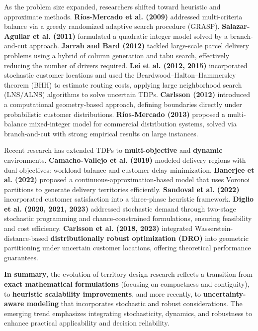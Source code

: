 \documentclass[preprint,12pt,authoryear]{elsarticle}
\begin{document}
As the problem size expanded, researchers shifted toward heuristic and approximate methods. \textbf{Ríos-Mercado et al. (2009)} addressed multi-criteria balance via a greedy randomized adaptive search procedure (GRASP). \textbf{Salazar-Aguilar et al. (2011)} formulated a quadratic integer model solved by a branch-and-cut approach. \textbf{Jarrah and Bard (2012)} tackled large-scale parcel delivery problems using a hybrid of column generation and tabu search, effectively reducing the number of drivers required. \textbf{Lei et al. (2012, 2015)} incorporated stochastic customer locations and used the Beardwood–Halton–Hammersley theorem (BHH) to estimate routing costs, applying large neighborhood search (LNS/ALNS) algorithms to solve uncertain TDPs. \textbf{Carlsson (2012)} introduced a computational geometry-based approach, defining boundaries directly under probabilistic customer distributions. \textbf{Ríos-Mercado (2013)} proposed a multi-balance mixed-integer model for commercial distribution systems, solved via branch-and-cut with strong empirical results on large instances.

Recent research has extended TDPs to \textbf{multi-objective} and \textbf{dynamic} environments. \textbf{Camacho-Vallejo et al. (2019)} modeled delivery regions with dual objectives: workload balance and customer delay minimization. \textbf{Banerjee et al. (2022)} proposed a continuous-approximation-based model that uses Voronoi partitions to generate delivery territories efficiently. \textbf{Sandoval et al. (2022)} incorporated customer satisfaction into a three-phase heuristic framework. \textbf{Diglio et al. (2020, 2021, 2023)} addressed stochastic demand through two-stage stochastic programming and chance-constrained formulations, ensuring feasibility and cost efficiency. \textbf{Carlsson et al. (2018, 2023)} integrated Wasserstein-distance-based \textbf{distributionally robust optimization (DRO)} into geometric partitioning under uncertain customer locations, offering theoretical performance guarantees.

\textbf{In summary}, the evolution of territory design research reflects a transition from \textbf{exact mathematical formulations} (focusing on compactness and contiguity), to \textbf{heuristic scalability improvements}, and more recently, to \textbf{uncertainty-aware modeling} that incorporates stochastic and robust considerations. The emerging trend emphasizes integrating stochasticity, dynamics, and robustness to enhance practical applicability and decision reliability.
\end{document}
